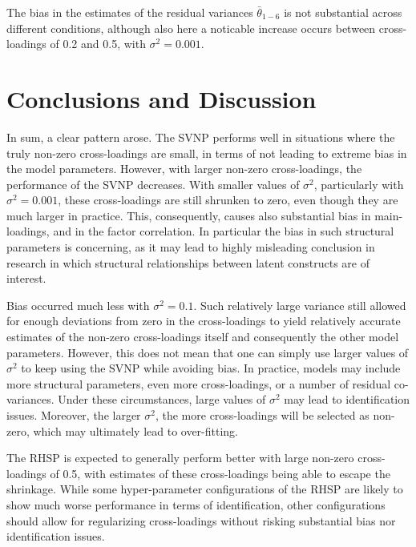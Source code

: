 \documentclass[
  man,floatsintext]{apa6}
\begin{document}
The bias in the estimates of the residual variances \(\bar{\theta}_{1-6}\) is not substantial across different conditions, although also here a noticable increase occurs between cross-loadings of 0.2 and 0.5, with \(\sigma^2 = 0.001\).

\hypertarget{conclusions-and-discussion}{%
\section{Conclusions and Discussion}\label{conclusions-and-discussion}}

In sum, a clear pattern arose. The SVNP performs well in situations where the truly non-zero cross-loadings are small, in terms of not leading to extreme bias in the model parameters. However, with larger non-zero cross-loadings, the performance of the SVNP decreases. With smaller values of \(\sigma^2\), particularly with \(\sigma^2 = 0.001\), these cross-loadings are still shrunken to zero, even though they are much larger in practice. This, consequently, causes also substantial bias in main-loadings, and in the factor correlation. In particular the bias in such structural parameters is concerning, as it may lead to highly misleading conclusion in research in which structural relationships between latent constructs are of interest.

Bias occurred much less with \(\sigma^2 = 0.1\). Such relatively large variance still allowed for enough deviations from zero in the cross-loadings to yield relatively accurate estimates of the non-zero cross-loadings itself and consequently the other model parameters. However, this does not mean that one can simply use larger values of \(\sigma^2\) to keep using the SVNP while avoiding bias. In practice, models may include more structural parameters, even more cross-loadings, or a number of residual co-variances. Under these circumstances, large values of \(\sigma^2\) may lead to identification issues. Moreover, the larger \(\sigma^2\), the more cross-loadings will be selected as non-zero, which may ultimately lead to over-fitting.

The RHSP is expected to generally perform better with large non-zero cross-loadings of 0.5, with estimates of these cross-loadings being able to escape the shrinkage. While some hyper-parameter configurations of the RHSP are likely to show much worse performance in terms of identification, other configurations should allow for regularizing cross-loadings without risking substantial bias nor identification issues.
\end{document}
